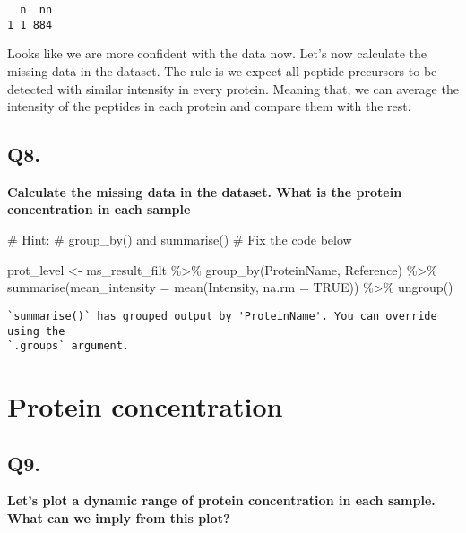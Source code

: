 \documentclass[
  letterpaper,
  DIV=11,
  numbers=noendperiod]{scrartcl}
\newenvironment{Shaded}{\begin{snugshade}}{\end{snugshade}}
\newcommand{\AttributeTok}[1]{\textcolor[rgb]{0.40,0.45,0.13}{#1}}
\newcommand{\CommentTok}[1]{\textcolor[rgb]{0.37,0.37,0.37}{#1}}
\newcommand{\ConstantTok}[1]{\textcolor[rgb]{0.56,0.35,0.01}{#1}}
\newcommand{\FunctionTok}[1]{\textcolor[rgb]{0.28,0.35,0.67}{#1}}
\newcommand{\NormalTok}[1]{\textcolor[rgb]{0.00,0.23,0.31}{#1}}
\newcommand{\OtherTok}[1]{\textcolor[rgb]{0.00,0.23,0.31}{#1}}
\newcommand{\SpecialCharTok}[1]{\textcolor[rgb]{0.37,0.37,0.37}{#1}}
\begin{document}
\begin{verbatim}
  n  nn
1 1 884
\end{verbatim}

Looks like we are more confident with the data now. Let's now calculate
the missing data in the dataset. The rule is we expect all peptide
precursors to be detected with similar intensity in every protein.
Meaning that, we can average the intensity of the peptides in each
protein and compare them with the rest.

\subsection{Q8.}\label{q8.}

\textbf{Calculate the missing data in the dataset. What is the protein
concentration in each sample}

\begin{Shaded}
\begin{Highlighting}[]
\CommentTok{\# Hint: \# group\_by() and summarise()}
\CommentTok{\# Fix the code below}

\NormalTok{prot\_level }\OtherTok{\textless{}{-}}\NormalTok{ ms\_result\_filt }\SpecialCharTok{\%\textgreater{}\%} 
  \FunctionTok{group\_by}\NormalTok{(ProteinName, Reference) }\SpecialCharTok{\%\textgreater{}\%} 
  \FunctionTok{summarise}\NormalTok{(}\AttributeTok{mean\_intensity =} \FunctionTok{mean}\NormalTok{(Intensity, }\AttributeTok{na.rm =} \ConstantTok{TRUE}\NormalTok{)) }\SpecialCharTok{\%\textgreater{}\%} 
  \FunctionTok{ungroup}\NormalTok{()}
\end{Highlighting}
\end{Shaded}

\begin{verbatim}
`summarise()` has grouped output by 'ProteinName'. You can override using the
`.groups` argument.
\end{verbatim}

\section{Protein concentration}\label{protein-concentration}

\subsection{Q9.}\label{q9.}

\textbf{Let's plot a dynamic range of protein concentration in each
sample. What can we imply from this plot?}
\end{document}
